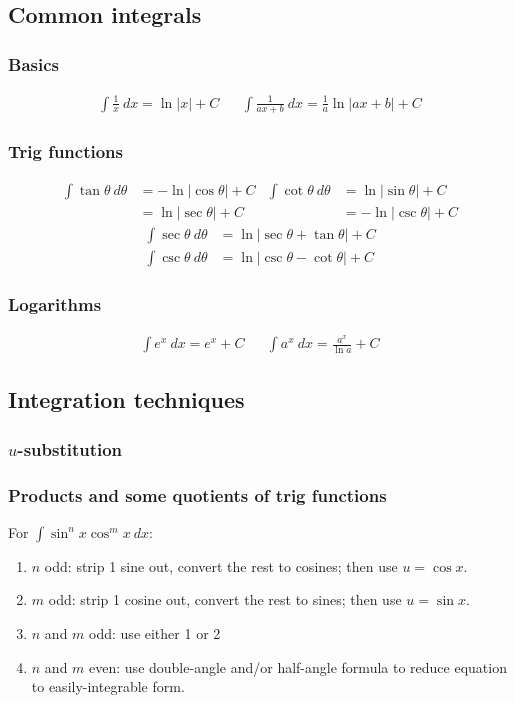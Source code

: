 \documentclass[main.tex]{subfiles}
\begin{document}
\begin{multicols}{2}
	\subsection*{Common integrals}
	\subsubsection*{Basics}
	\begin{align*}
	\int \frac{1}{x} \ dx = \ln |x| + C && \int \frac{1}{ax + b} \ dx = \frac{1}{a} \ln |ax + b| + C
	\end{align*}

	\subsubsection*{Trig functions}
	\begin{align*}
		\int \tan{\theta} \ d\theta &= -\ln{|\cos{\theta}|} + C & \int \cot{\theta} \ d\theta &= \ln{|\sin{\theta}|} + C \\
		&= \ln{|\sec{\theta}|} + C & &= -\ln{|\csc{\theta}|} + C
	\end{align*}
	\begin{align*}
		\int \sec{\theta} \ d\theta &= \ln{|\sec{\theta} + \tan{\theta}|} + C \\
		\int \csc{\theta} \ d\theta &= \ln{|\csc{\theta} - \cot{\theta}|} + C
	\end{align*}
	\subsubsection*{Logarithms}
	\begin{align*}
	\int e^x \ dx = e^x + C && \int a^x \ dx = \frac{a^x}{\ln{a}} + C
	\end{align*}

	\subsection*{Integration techniques}
	\subsubsection*{\(u\)-substitution}

	\subsubsection*{Products and some quotients of trig functions}
	For \(\displaystyle \int \sin^n{x} \cos^m{x} \ dx\):
	\begin{enumerate}
	\item \(n\) odd: strip 1 sine out, convert the rest to cosines; then use \(u = \cos{x}\).
	\item \(m\) odd: strip 1 cosine out, convert the rest to sines; then use \(u = \sin{x}\).
	\item \(n\) and \(m\) odd: use either 1 or 2
	\item \(n\) and \(m\) even: use double-angle and/or half-angle formula to reduce equation to easily-integrable form.
	\end{enumerate}


\end{multicols}
\end{document}

